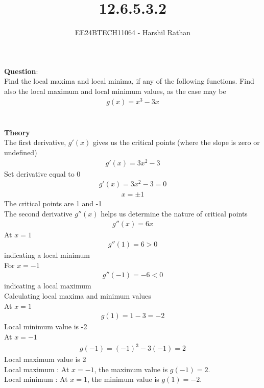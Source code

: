 \documentclass[journal]{IEEEtran}
\begin{document}

\vspace{3cm}

\title{12.6.5.3.2}
\author{EE24BTECH11064 - Harshil Rathan}
 \maketitle
{\let\newpage\relax\maketitle}

\renewcommand{\thefigure}{\theenumi}
\renewcommand{\thetable}{\theenumi}
\setlength{\intextsep}{10pt} %


\renewcommand{\thetable}{\theenumi}

\textbf{Question}:\\
Find the local maxima and local minima, if any of the following functions. Find also the local maximum and local minimum values, as the case may be 
\begin{align*}
    g(x) = x^3-3x
\end{align*}\\ 
\solution \\
\textbf{Theory} \\
The first derivative, $g'(x)$ gives us the critical points (where the slope is zero or undefined) 
\begin{align}
     g'(x) = 3x^2- 3
     \label{0.1}
\end{align}
Set derivative equal to 0 
\begin{align}
    g'(x) = 3x^2-3 = 0 
\end{align}
\begin{align}
    x = \pm 1 
\end{align}
The critical points are 1 and -1 \\
The second derivative $g''(x)$ helps us determine the nature of critical points 
\begin{align}
  g''(x) = 6x
\end{align}
At $x = 1$ 
\begin{align}
    g''(1) = 6 > 0 
\end{align}
indicating a local minimum \\
For $x = -1$ 
\begin{align}
    g''(-1) = -6 < 0
\end{align}
indicating a local maximum \\
Calculating local maxima and minimum values \\
At $x=1$
\begin{align}
   g(1) = 1 - 3 = - 2 
\end{align}
Local minimum value is -2 \\
At $x=-1$
\begin{align}
  g(-1) = (-1)^3 -3(-1) = 2 
\end{align}
Local maximum value is 2  \\
Local maximum : At \(x = -1\), the maximum value is \(g(-1) = 2\). \\
Local minimum : At \(x = 1\), the minimum value is \(g(1) = -2\).
\end{document}
